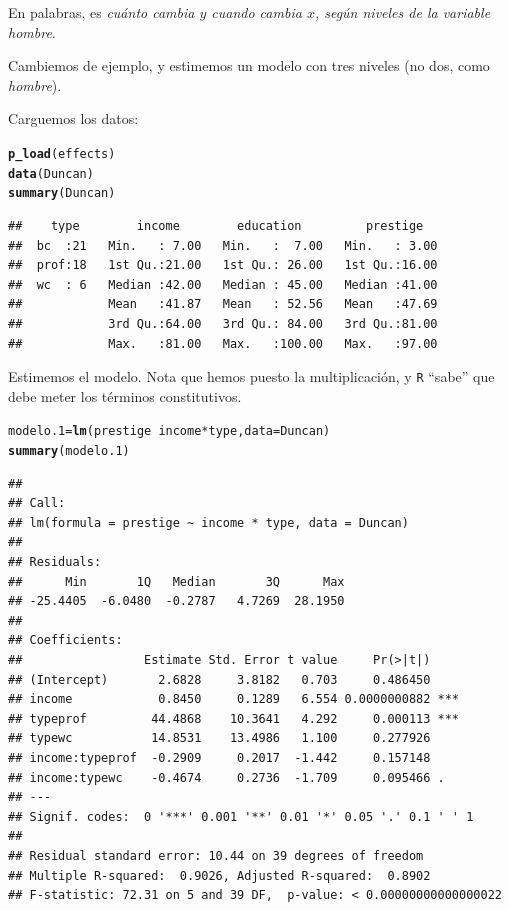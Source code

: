 \documentclass[onesided]{article}\usepackage[]{graphicx}\usepackage[]{color}
\makeatletter
\newcommand{\hlopt}[1]{\textcolor[rgb]{0,0,0}{#1}}%
\newcommand{\hlstd}[1]{\textcolor[rgb]{0.345,0.345,0.345}{#1}}%
\newcommand{\hlkwb}[1]{\textcolor[rgb]{0.69,0.353,0.396}{#1}}%
\newcommand{\hlkwc}[1]{\textcolor[rgb]{0.333,0.667,0.333}{#1}}%
\newcommand{\hlkwd}[1]{\textcolor[rgb]{0.737,0.353,0.396}{\textbf{#1}}}%
\newenvironment{kframe}{%
 \def\at@end@of@kframe{}%
 \ifinner\ifhmode%
  \def\at@end@of@kframe{\end{minipage}}%
  \begin{minipage}{\columnwidth}%
 \fi\fi%
 \def\FrameCommand##1{\hskip\@totalleftmargin \hskip-\fboxsep
 \colorbox{shadecolor}{##1}\hskip-\fboxsep
     \hskip-\linewidth \hskip-\@totalleftmargin \hskip\columnwidth}%
 \MakeFramed {\advance\hsize-\width
   \@totalleftmargin\z@ \linewidth\hsize
   \@setminipage}}%
 {\par\unskip\endMakeFramed%
 \at@end@of@kframe}
\newenvironment{knitrout}{}{} %
\makeatother
\begin{document}
En palabras, es \emph{cu\'anto cambia $y$ cuando cambia $x$, seg\'un niveles de la variable hombre}.

Cambiemos de ejemplo, y estimemos un modelo con tres niveles (no dos, como \emph{hombre}).

Carguemos los datos:


\begin{knitrout}
\color{fgcolor}\begin{kframe}
\begin{alltt}
\hlkwd{p_load}\hlstd{(effects)}
\hlkwd{data}\hlstd{(Duncan)}
\hlkwd{summary}\hlstd{(Duncan)}
\end{alltt}
\begin{verbatim}
##    type        income        education         prestige    
##  bc  :21   Min.   : 7.00   Min.   :  7.00   Min.   : 3.00  
##  prof:18   1st Qu.:21.00   1st Qu.: 26.00   1st Qu.:16.00  
##  wc  : 6   Median :42.00   Median : 45.00   Median :41.00  
##            Mean   :41.87   Mean   : 52.56   Mean   :47.69  
##            3rd Qu.:64.00   3rd Qu.: 84.00   3rd Qu.:81.00  
##            Max.   :81.00   Max.   :100.00   Max.   :97.00
\end{verbatim}
\end{kframe}
\end{knitrout}

Estimemos el modelo. Nota que hemos puesto la multiplicaci\'on, y \texttt{R} ``sabe'' que debe meter los t\'erminos constitutivos.

\begin{knitrout}
\color{fgcolor}\begin{kframe}
\begin{alltt}
\hlstd{modelo.1} \hlkwb{=} \hlkwd{lm}\hlstd{(prestige} \hlopt{~} \hlstd{income}\hlopt{*}\hlstd{type,} \hlkwc{data} \hlstd{= Duncan)}
\hlkwd{summary}\hlstd{(modelo.1)}
\end{alltt}
\begin{verbatim}
## 
## Call:
## lm(formula = prestige ~ income * type, data = Duncan)
## 
## Residuals:
##      Min       1Q   Median       3Q      Max 
## -25.4405  -6.0480  -0.2787   4.7269  28.1950 
## 
## Coefficients:
##                 Estimate Std. Error t value     Pr(>|t|)    
## (Intercept)       2.6828     3.8182   0.703     0.486450    
## income            0.8450     0.1289   6.554 0.0000000882 ***
## typeprof         44.4868    10.3641   4.292     0.000113 ***
## typewc           14.8531    13.4986   1.100     0.277926    
## income:typeprof  -0.2909     0.2017  -1.442     0.157148    
## income:typewc    -0.4674     0.2736  -1.709     0.095466 .  
## ---
## Signif. codes:  0 '***' 0.001 '**' 0.01 '*' 0.05 '.' 0.1 ' ' 1
## 
## Residual standard error: 10.44 on 39 degrees of freedom
## Multiple R-squared:  0.9026,	Adjusted R-squared:  0.8902 
## F-statistic: 72.31 on 5 and 39 DF,  p-value: < 0.00000000000000022
\end{verbatim}
\end{kframe}
\end{knitrout}
\end{document}
